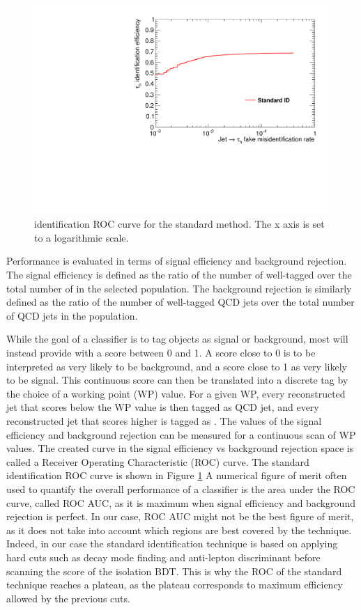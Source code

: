 \begin{figure}
    \centering
    \includegraphics[width=\textwidth]{Images/ROC_comp_std.pdf}
    \caption{\tauh identification ROC curve for the standard method. The x axis is set to a logarithmic scale.}
    \label{fig:std_ROC}
\end{figure}

Performance is evaluated in terms of signal efficiency and background rejection. The signal efficiency is defined as the ratio of the number of well-tagged \tauh over the total number of \tauh in the selected population. The background rejection is similarly defined as the ratio of the number of well-tagged QCD jets over the total number of QCD jets in the population.

While the goal of a classifier is to tag objects as signal or background, most will instead provide with a score between 0 and 1. A score close to 0 is to be interpreted as very likely to be background, and a score close to 1 as very likely to be signal. This continuous score can then be translated into a discrete tag by the choice of a working point (WP) value. For a given WP, every reconstructed jet that scores below the WP value is then tagged as QCD jet, and every reconstructed jet that scores higher is tagged as \tauh. The values of the signal efficiency and background rejection can be measured for a continuous scan of WP values. The created curve in the signal efficiency vs background rejection space is called a Receiver Operating Characteristic (ROC) curve. The standard identification ROC curve is shown in Figure \ref{fig:std_ROC}
A numerical figure of merit often used to quantify the overall performance of a classifier is the area under the ROC curve, called ROC AUC, as it is maximum when signal efficiency and background rejection is perfect.
In our case, ROC AUC might not be the best figure of merit, as it does not take into account which regions are best covered by the technique. Indeed, in our case the standard identification technique is based on applying hard cuts such as decay mode finding and anti-lepton discriminant before scanning the score of the isolation BDT. This is why the ROC of the standard technique reaches a plateau, as the plateau corresponds to maximum efficiency allowed by the previous cuts.


